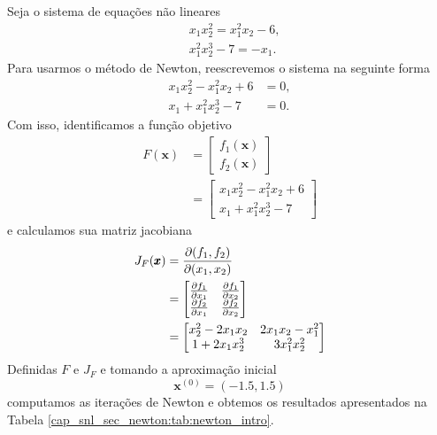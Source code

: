 \begin{ex}\label{cap_snl_sec_newton:ex:newton_intro}
  Seja o sistema de equações não lineares
  \begin{subequations}
    \begin{align}
      & x_1x_2^2 = x_1^2x_2 - 6,\\
      & x_1^2x_2^3 - 7 = -x_1.
    \end{align}
  \end{subequations}
  Para usarmos o método de Newton, reescrevemos o sistema na seguinte forma
  \begin{subequations}
    \begin{align}
      x_1x_2^2 - x_1^2x_2 + 6 &= 0,\\
      x_1 + x_1^2x_2^3 - 7 &= 0.
    \end{align}
\end{subequations}
  Com isso, identificamos a função objetivo
  \begin{align}
    F(\pmb{x}) &=
    \begin{bmatrix}
      f_1(\pmb{x})\\
      f_2(\pmb{x})
    \end{bmatrix}\\
    &=
    \begin{bmatrix}
      x_1x_2^2 - x_1^2x_2 + 6\\
      x_1 + x_1^2x_2^3 - 7
    \end{bmatrix}
  \end{align}
  e calculamos sua matriz jacobiana
  \begin{align}
    J_F(\pmb{x}) &= \frac{\partial(f_1, f_2)}{\partial(x_1, x_2)} \\
                 &=
                   \begin{bmatrix}
                     \frac{\partial f_1}{\partial x_1} & \frac{\partial f_1}{\partial x_2}\\
                     \frac{\partial f_2}{\partial x_1} & \frac{\partial f_2}{\partial x_2}\\
                   \end{bmatrix}\\
                 &=
                   \begin{bmatrix}
                     x_2^2 - 2x_1x_2 & 2x_1x_2-x_1^2\\
                     1+2x_1x_2^3 & 3x_1^2x_2^2
                   \end{bmatrix}
  \end{align}
  Definidas $F$ e $J_F$ e tomando a aproximação inicial
  \begin{equation}
    \pmb{x}^{(0)} = (-1.5, 1.5)
  \end{equation}
  computamos as iterações de Newton e obtemos os resultados apresentados na Tabela \ref{cap_snl_sec_newton:tab:newton_intro}.


\end{ex}

